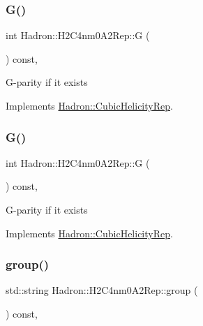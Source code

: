 \subsubsection{\texorpdfstring{G()}{G()}\hspace{0.1cm}{\footnotesize\ttfamily [1/2]}}
{\footnotesize\ttfamily int Hadron\+::\+H2\+C4nm0\+A2\+Rep\+::G (\begin{DoxyParamCaption}{ }\end{DoxyParamCaption}) const\hspace{0.3cm}{\ttfamily [inline]}, {\ttfamily [virtual]}}

G-\/parity if it exists 

Implements \mbox{\hyperlink{structHadron_1_1CubicHelicityRep_a50689f42be1e6170aa8cf6ad0597018b}{Hadron\+::\+Cubic\+Helicity\+Rep}}.

\mbox{\label{structHadron_1_1H2C4nm0A2Rep_a2857fb3aaa46dc918bb0830e875cc3ca}} 
\subsubsection{\texorpdfstring{G()}{G()}\hspace{0.1cm}{\footnotesize\ttfamily [2/2]}}
{\footnotesize\ttfamily int Hadron\+::\+H2\+C4nm0\+A2\+Rep\+::G (\begin{DoxyParamCaption}{ }\end{DoxyParamCaption}) const\hspace{0.3cm}{\ttfamily [inline]}, {\ttfamily [virtual]}}

G-\/parity if it exists 

Implements \mbox{\hyperlink{structHadron_1_1CubicHelicityRep_a50689f42be1e6170aa8cf6ad0597018b}{Hadron\+::\+Cubic\+Helicity\+Rep}}.

\mbox{\label{structHadron_1_1H2C4nm0A2Rep_a91188ca54be99a0d11ac82323d7637ce}} 
\subsubsection{\texorpdfstring{group()}{group()}\hspace{0.1cm}{\footnotesize\ttfamily [1/3]}}
{\footnotesize\ttfamily std\+::string Hadron\+::\+H2\+C4nm0\+A2\+Rep\+::group (\begin{DoxyParamCaption}{ }\end{DoxyParamCaption}) const\hspace{0.3cm}{\ttfamily [inline]}, {\ttfamily [virtual]}}


